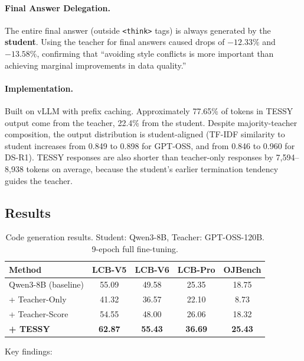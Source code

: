 \documentclass[11pt]{article}
\begin{document}
\paragraph{Final Answer Delegation.}
The entire final answer (outside \texttt{<think>} tags) is always generated by the \textbf{student}. Using the teacher for final answers caused drops of $-12.33\%$ and $-13.58\%$, confirming that ``avoiding style conflicts is more important than achieving marginal improvements in data quality.''

\paragraph{Implementation.}
Built on vLLM with prefix caching. Approximately 77.65\% of tokens in TESSY output come from the teacher, 22.4\% from the student. Despite majority-teacher composition, the output distribution is student-aligned (TF-IDF similarity to student increases from 0.849 to 0.898 for GPT-OSS, and from 0.846 to 0.960 for DS-R1). TESSY responses are also shorter than teacher-only responses by 7,594--8,938 tokens on average, because the student's earlier termination tendency guides the teacher.

\subsection{Results}

\begin{table}[h]
\centering
\caption{Code generation results. Student: Qwen3-8B, Teacher: GPT-OSS-120B. 9-epoch full fine-tuning.}
\begin{tabular}{lcccc}
\toprule
\textbf{Method} & \textbf{LCB-V5} & \textbf{LCB-V6} & \textbf{LCB-Pro} & \textbf{OJBench} \\
\midrule
Qwen3-8B (baseline) & 55.09 & 49.58 & 25.35 & 18.75 \\
+ Teacher-Only & 41.32 & 36.57 & 22.10 & 8.73 \\
+ Teacher-Score & 54.55 & 48.00 & 26.06 & 18.32 \\
\textbf{+ TESSY} & \textbf{62.87} & \textbf{55.43} & \textbf{36.69} & \textbf{25.43} \\
\bottomrule
\end{tabular}
\end{table}

Key findings:
\end{document}
